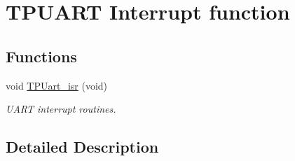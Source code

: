 \hypertarget{group___k_n_x___p_h___t_p_uart___exported___functions___group3}{}\section{T\+P\+U\+A\+RT Interrupt function}
\label{group___k_n_x___p_h___t_p_uart___exported___functions___group3}
\subsection*{Functions}
\begin{DoxyCompactItemize}
\item 
void \hyperlink{group___k_n_x___p_h___t_p_uart___exported___functions___group3_gad51a61eaadc78ba1bc04231611c8ee60}{T\+P\+Uart\+\_\+isr} (void)\hypertarget{group___k_n_x___p_h___t_p_uart___exported___functions___group3_gad51a61eaadc78ba1bc04231611c8ee60}{}\label{group___k_n_x___p_h___t_p_uart___exported___functions___group3_gad51a61eaadc78ba1bc04231611c8ee60}

\begin{DoxyCompactList}\small\item\em U\+A\+RT interrupt routines. \end{DoxyCompactList}\end{DoxyCompactItemize}


\subsection{Detailed Description}
